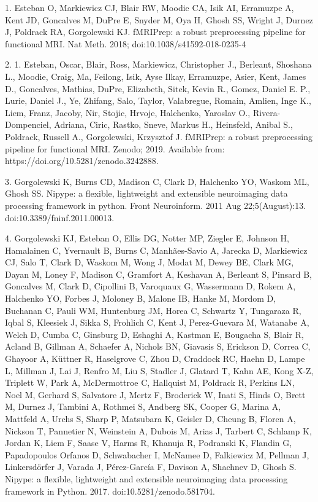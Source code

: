 1. Esteban O, Markiewicz CJ, Blair RW, Moodie CA, Isik AI, Erramuzpe A, Kent JD, Goncalves M, DuPre E, Snyder M, Oya H, Ghosh SS, Wright J, Durnez J, Poldrack RA, Gorgolewski KJ. fMRIPrep: a robust preprocessing pipeline for functional MRI. Nat Meth. 2018; doi:10.1038/s41592-018-0235-4

2. 1. Esteban, Oscar, Blair, Ross, Markiewicz, Christopher J., Berleant, Shoshana L., Moodie, Craig, Ma, Feilong, Isik, Ayse Ilkay, Erramuzpe, Asier, Kent, James D., Goncalves, Mathias, DuPre, Elizabeth, Sitek, Kevin R., Gomez, Daniel E. P., Lurie, Daniel J., Ye, Zhifang, Salo, Taylor, Valabregue, Romain, Amlien, Inge K., Liem, Franz, Jacoby, Nir, Stojic, Hrvoje, Halchenko, Yaroslav O., Rivera-Dompenciel, Adriana, Ciric, Rastko, Sneve, Markus H., Heinsfeld, Anibal S., Poldrack, Russell A., Gorgolewski, Krzysztof J. fMRIPrep: a robust preprocessing pipeline for functional MRI. Zenodo; 2019. Available from: https://doi.org/10.5281/zenodo.3242888.

3. Gorgolewski K, Burns CD, Madison C, Clark D, Halchenko YO, Waskom ML, Ghosh SS. Nipype: a flexible, lightweight and extensible neuroimaging data processing framework in python. Front Neuroinform. 2011 Aug 22;5(August):13. doi:10.3389/fninf.2011.00013.

4. Gorgolewski KJ, Esteban O, Ellis DG, Notter MP, Ziegler E, Johnson H, Hamalainen C, Yvernault B, Burns C, Manhães-Savio A, Jarecka D, Markiewicz CJ, Salo T, Clark D, Waskom M, Wong J, Modat M, Dewey BE, Clark MG, Dayan M, Loney F, Madison C, Gramfort A, Keshavan A, Berleant S, Pinsard B, Goncalves M, Clark D, Cipollini B, Varoquaux G, Wassermann D, Rokem A, Halchenko YO, Forbes J, Moloney B, Malone IB, Hanke M, Mordom D, Buchanan C, Pauli WM, Huntenburg JM, Horea C, Schwartz Y, Tungaraza R, Iqbal S, Kleesiek J, Sikka S, Frohlich C, Kent J, Perez-Guevara M, Watanabe A, Welch D, Cumba C, Ginsburg D, Eshaghi A, Kastman E, Bougacha S, Blair R, Acland B, Gillman A, Schaefer A, Nichols BN, Giavasis S, Erickson D, Correa C, Ghayoor A, Küttner R, Haselgrove C, Zhou D, Craddock RC, Haehn D, Lampe L, Millman J, Lai J, Renfro M, Liu S, Stadler J, Glatard T, Kahn AE, Kong X-Z, Triplett W, Park A, McDermottroe C, Hallquist M, Poldrack R, Perkins LN, Noel M, Gerhard S, Salvatore J, Mertz F, Broderick W, Inati S, Hinds O, Brett M, Durnez J, Tambini A, Rothmei S, Andberg SK, Cooper G, Marina A, Mattfeld A, Urchs S, Sharp P, Matsubara K, Geisler D, Cheung B, Floren A, Nickson T, Pannetier N, Weinstein A, Dubois M, Arias J, Tarbert C, Schlamp K, Jordan K, Liem F, Saase V, Harms R, Khanuja R, Podranski K, Flandin G, Papadopoulos Orfanos D, Schwabacher I, McNamee D, Falkiewicz M, Pellman J, Linkersdörfer J, Varada J, Pérez-García F, Davison A, Shachnev D, Ghosh S. Nipype: a flexible, lightweight and extensible neuroimaging data processing framework in Python. 2017. doi:10.5281/zenodo.581704.

